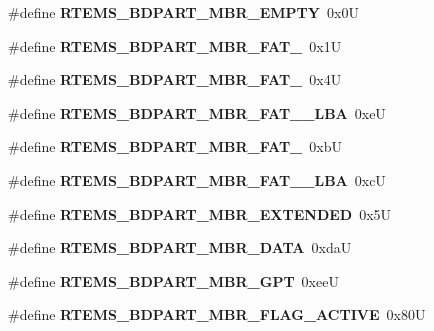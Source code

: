 \begin{DoxyCompactItemize}
\item 
\mbox{\label{group__rtems__bdpart_gaf186b3495fabb51c41aa873b8f1c3a88}} 
\#define {\bfseries R\+T\+E\+M\+S\+\_\+\+B\+D\+P\+A\+R\+T\+\_\+\+M\+B\+R\+\_\+\+E\+M\+P\+TY}~0x0U
\item 
\mbox{\label{group__rtems__bdpart_gafef6706a7af508914bfd38bcb5ec6ab5}} 
\#define {\bfseries R\+T\+E\+M\+S\+\_\+\+B\+D\+P\+A\+R\+T\+\_\+\+M\+B\+R\+\_\+\+F\+A\+T\+\_}~0x1U
\item 
\mbox{\label{group__rtems__bdpart_ga1bd23b3b634a6b78194ac369bf693ed0}} 
\#define {\bfseries R\+T\+E\+M\+S\+\_\+\+B\+D\+P\+A\+R\+T\+\_\+\+M\+B\+R\+\_\+\+F\+A\+T\+\_}~0x4U
\item 
\mbox{\label{group__rtems__bdpart_ga6478427f5dff02c51b95be3445cb2f4a}} 
\#define {\bfseries R\+T\+E\+M\+S\+\_\+\+B\+D\+P\+A\+R\+T\+\_\+\+M\+B\+R\+\_\+\+F\+A\+T\+\_\+\_\+\+L\+BA}~0xeU
\item 
\mbox{\label{group__rtems__bdpart_ga1a32932c0e4b12fe217cfa419175cc16}} 
\#define {\bfseries R\+T\+E\+M\+S\+\_\+\+B\+D\+P\+A\+R\+T\+\_\+\+M\+B\+R\+\_\+\+F\+A\+T\+\_}~0xbU
\item 
\mbox{\label{group__rtems__bdpart_gab50d853cffb7c74bf4a54df4c2661ad4}} 
\#define {\bfseries R\+T\+E\+M\+S\+\_\+\+B\+D\+P\+A\+R\+T\+\_\+\+M\+B\+R\+\_\+\+F\+A\+T\+\_\+\_\+\+L\+BA}~0xcU
\item 
\mbox{\label{group__rtems__bdpart_ga8fcb6a9656510ca403f689e45cc399a5}} 
\#define {\bfseries R\+T\+E\+M\+S\+\_\+\+B\+D\+P\+A\+R\+T\+\_\+\+M\+B\+R\+\_\+\+E\+X\+T\+E\+N\+D\+ED}~0x5U
\item 
\mbox{\label{group__rtems__bdpart_ga110870cb90704cb4023c83d4c163cf1e}} 
\#define {\bfseries R\+T\+E\+M\+S\+\_\+\+B\+D\+P\+A\+R\+T\+\_\+\+M\+B\+R\+\_\+\+D\+A\+TA}~0xdaU
\item 
\mbox{\label{group__rtems__bdpart_ga2a99614bf3f74b951e2d10f089ef20cd}} 
\#define {\bfseries R\+T\+E\+M\+S\+\_\+\+B\+D\+P\+A\+R\+T\+\_\+\+M\+B\+R\+\_\+\+G\+PT}~0xeeU
\item 
\mbox{\label{group__rtems__bdpart_gab935be5ef99cc8e89ec7f7a40338a9dc}} 
\#define {\bfseries R\+T\+E\+M\+S\+\_\+\+B\+D\+P\+A\+R\+T\+\_\+\+M\+B\+R\+\_\+\+F\+L\+A\+G\+\_\+\+A\+C\+T\+I\+VE}~0x80U
\end{DoxyCompactItemize}


